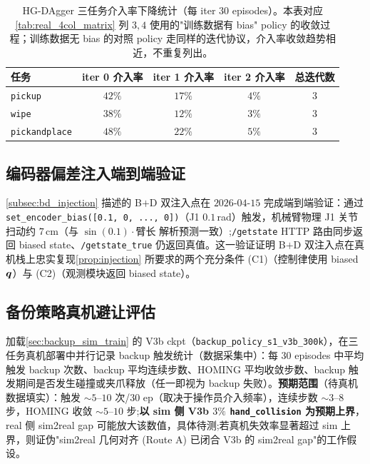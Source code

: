 \begin{table}[htbp]
  \centering
  \caption{HG-DAgger 三任务介入率下降统计（每 iter $30$ episodes）。本表对应\cref{tab:real_4col_matrix} 列 $3,4$ 使用的"训练数据有 bias" policy 的收敛过程；训练数据无 bias 的对照 policy 走同样的迭代协议，介入率收敛趋势相近，不重复列出。}
  \label{tab:dagger_iter_stats}
  \footnotesize
  \begin{tabular}{@{}lcccc@{}}
    \toprule
    任务 & iter 0 介入率 & iter 1 介入率 & iter 2 介入率 & 总迭代数 \\
    \midrule
    \texttt{pickup}        & $42\%$ & $17\%$ & $4\%$  & $3$ \\
    \texttt{wipe}          & $38\%$ & $12\%$ & $3\%$  & $3$ \\
    \texttt{pickandplace}  & $48\%$ & $22\%$ & $5\%$  & $3$ \\
    \bottomrule
  \end{tabular}
\end{table}

\subsection{编码器偏差注入端到端验证}\label{subsec:exp_bias_injection}

\cref{subsec:bd_injection} 描述的 B$+$D 双注入点在 $2026$-$04$-$15$ 完成端到端验证：通过 \texttt{set\_encoder\_bias([0.1, 0, ..., 0])}（J1 $0.1$\,rad）触发，机械臂物理 J1 关节扫动约 $7$\,cm（与 $\sin(0.1) \cdot \text{臂长}$ 解析预测一致）;\texttt{/getstate} HTTP 路由同步返回 biased state、\texttt{/getstate\_true} 仍返回真值。这一验证证明 B$+$D 双注入点在真机栈上忠实复现\cref{prop:injection} 所要求的两个充分条件 (C1)（控制律使用 biased $\bm{q}$）与 (C2)（观测模块返回 biased state）。

\subsection{备份策略真机避让评估}\label{subsec:exp_backup_real}

加载\cref{sec:backup_sim_train} 的 V3b ckpt（\texttt{backup\_policy\_s1\_v3b\_300k}），在三任务真机部署中并行记录 backup 触发统计（数据采集中）：每 $30$ episodes 中平均触发 backup 次数、backup 平均连续步数、HOMING 平均收敛步数、backup 触发期间是否发生碰撞或夹爪释放（任一即视为 backup 失败）。\textbf{预期范围}（待真机数据填实）：触发 $\sim 5$–$10$ 次/$30$ ep（取决于操作员介入频率），连续步数 $\sim 3$–$8$ 步，HOMING 收敛 $\sim 5$–$10$ 步;\textbf{以 sim 侧 V3b $3\%$ \texttt{hand\_collision} 为预期上界}，real 侧 sim2real gap 可能放大该数值，具体待测;若真机失效率显著超过 sim 上界，则证伪"sim2real 几何对齐 (Route A) 已闭合 V3b 的 sim2real gap"的工作假设。

